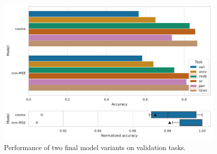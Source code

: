 \begin{figure}
    \centering
    \includegraphics[width=\textwidth]{img/experiments_final_models.pdf}

    \caption{Performance of two final model variants on validation tasks.}

    \label{fig:experiments_final_comparison}

\end{figure}
